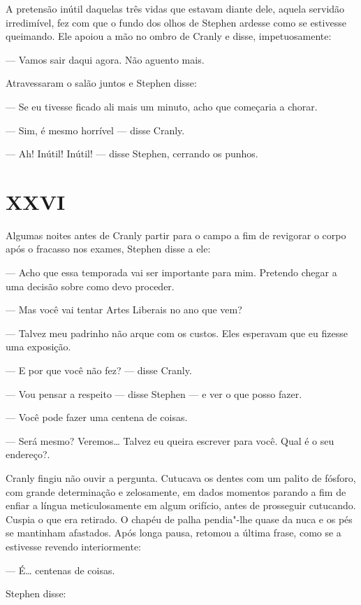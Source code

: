 A pretensão inútil daquelas três vidas que estavam diante dele,
aquela servidão irredimível, fez com que o fundo dos olhos de Stephen
ardesse como se estivesse queimando.  Ele apoiou a mão no
ombro de Cranly e disse, impetuosamente:

--- Vamos sair daqui agora.  Não aguento mais.

Atravessaram o salão juntos e Stephen disse:

--- Se eu tivesse ficado ali mais um minuto, acho que começaria a
chorar.

--- Sim, é mesmo horrível --- disse Cranly.

--- Ah!  Inútil!  Inútil! --- disse Stephen, cerrando os punhos.


\section{XXVI}

Algumas noites antes de Cranly partir para o campo a fim de
revigorar o corpo após o fracasso nos exames, Stephen disse a ele:

--- Acho que essa temporada vai ser importante para mim. 
Pretendo chegar a uma decisão sobre como devo proceder.

--- Mas você vai tentar Artes Liberais no ano que vem?

--- Talvez meu padrinho não arque com os custos.  Eles esperavam
que eu fizesse uma exposição.

--- E por que você não fez? --- disse Cranly.

--- Vou pensar a respeito --- disse Stephen --- e ver o que posso
fazer.

--- Você pode fazer uma centena de coisas.

--- Será mesmo?  Veremos\ldots{}  Talvez eu queira escrever para você.
\label{qual"-e} Qual é o seu endereço?.

Cranly fingiu não ouvir a pergunta.  Cutucava os dentes com um
palito de fósforo, com grande determinação \label{e"-zelosamente} e zelosamente, em dados
momentos parando a fim de enfiar a língua meticulosamente em algum
orifício, antes de prosseguir cutucando.  Cuspia o que era retirado. 
O chapéu de palha pendia"-lhe quase da nuca e os pés se mantinham
afastados.  Após longa pausa, retomou a última frase, como se a
estivesse revendo interiormente:

--- É\ldots{} centenas de coisas.

Stephen disse:

